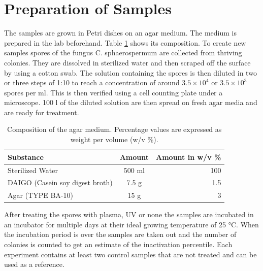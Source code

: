 \section{Preparation of Samples}
The samples are grown in Petri dishes on an agar medium. The medium is prepared in the lab beforehand. Table \ref{tab:medium} shows its composition. To create new samples spores of the fungus C. sphaerospermum are collected from thriving colonies. They are dissolved in sterilized water and then scraped off the surface by using a cotton swab. The solution containing the spores is then diluted in two or three steps of 1:10 to reach a concentration of around $3.5\times 10^4$ or $3.5\times 10^3$ spores per ml. This is then verified using a cell counting plate under a microscope. 100 \textmu l of the diluted solution are then spread on fresh agar media and are ready for treatment.

\begin{table}
    \centering
    \caption[Composition of the agar medium]{Composition of the agar medium. Percentage values are expressed as weight per volume (w/v \%).}
    \vspace*{1em}
    \begin{tabular}{lcr}
    Substance & Amount & Amount in w/v \% \\
    \hline
    Sterilized Water & 500 ml & 100 \\
    DAIGO (Casein soy digest broth) & 7.5 g & 1.5 \\
    Agar (TYPE BA-10) & 15 g & 3 \\
    \end{tabular}
    \label{tab:medium}
\end{table}

After treating the spores with plasma, UV or none the samples are incubated in an incubator for multiple days at their ideal growing temperature of 25 °C. When the incubation period is over the samples are taken out and the number of colonies is counted to get an estimate of the inactivation percentile. Each experiment contains at least two control samples that are not treated and can be used as a reference.

